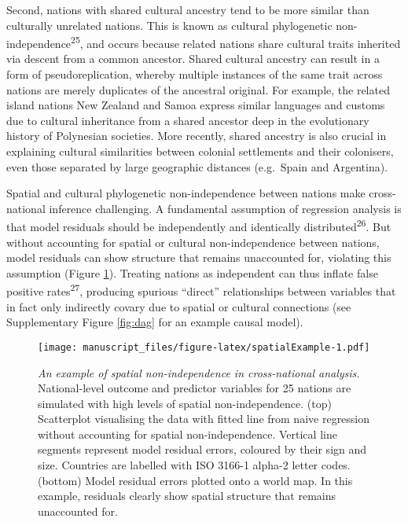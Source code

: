 \documentclass[
  english,
  man,floatsintext]{apa6}
\begin{document}
Second, nations with shared cultural ancestry tend to be more similar than culturally unrelated nations. This is known as cultural phylogenetic non-independence\textsuperscript{25}, and occurs because related nations share cultural traits inherited via descent from a common ancestor. Shared cultural ancestry can result in a form of pseudoreplication, whereby multiple instances of the same trait across nations are merely duplicates of the ancestral original. For example, the related island nations New Zealand and Samoa express similar languages and customs due to cultural inheritance from a shared ancestor deep in the evolutionary history of Polynesian societies. More recently, shared ancestry is also crucial in explaining cultural similarities between colonial settlements and their colonisers, even those separated by large geographic distances (e.g.~Spain and Argentina).

Spatial and cultural phylogenetic non-independence between nations make cross-national inference challenging. A fundamental assumption of regression analysis is that model residuals should be independently and identically distributed\textsuperscript{26}. But without accounting for spatial or cultural non-independence between nations, model residuals can show structure that remains unaccounted for, violating this assumption (Figure \ref{fig:spatialExample}). Treating nations as independent can thus inflate false positive rates\textsuperscript{27}, producing spurious \enquote{direct} relationships between variables that in fact only indirectly covary due to spatial or cultural connections (see Supplementary Figure \ref{fig:dag} for an example causal model).



\begin{figure}
\centering
\texttt{[image: manuscript\_files/figure-latex/spatialExample-1.pdf]}
\caption{\label{fig:spatialExample}\emph{An example of spatial non-independence in cross-national analysis.} National-level outcome and predictor variables for 25 nations are simulated with high levels of spatial non-independence. (top) Scatterplot visualising the data with fitted line from naive regression without accounting for spatial non-independence. Vertical line segments represent model residual errors, coloured by their sign and size. Countries are labelled with ISO 3166-1 alpha-2 letter codes. (bottom) Model residual errors plotted onto a world map. In this example, residuals clearly show spatial structure that remains unaccounted for.}
\end{figure}
\end{document}
